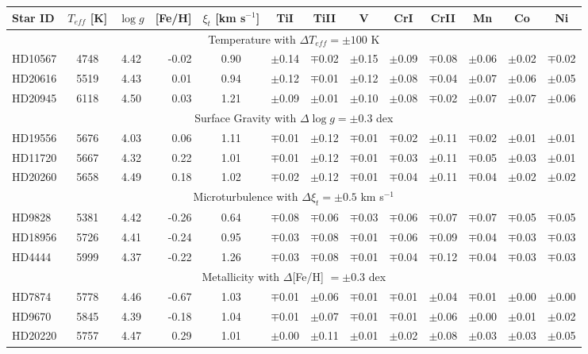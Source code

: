 \documentclass[oldversion]{aa}
\newcommand\T{\rule{0pt}{2.6ex}}
\newcommand\B{\rule[-1.2ex]{0pt}{0pt}}
\begin{document}
\begin{table}[t!]
\begin{tabular}{ l c c r c c c c c c c c}



\end{tabular}

  \begin{tabular}{l c c r c c c c c c c c c}

  \hline
Star ID \T & $T_{eff}$ [K] & $\log g$ & [Fe/H] & $\xi_t$ [km s$^{-1}$]	& TiI & TiII & V & CrI & CrII & Mn & Co & Ni \B \\
\hline
\multicolumn {13}{c}{Temperature with $\Delta T_{eff}=\pm100$ K} \\
HD10567 & 4748 & 4.42 & -0.02 & 0.90 & $\pm$0.14 & $\mp$0.02 & $\pm$0.15 & $\pm$0.09 & $\mp$0.08 & $\pm$0.06 & $\pm$0.02 & $\mp$0.02 \\
HD20616 & 5519 & 4.43 &  0.01 & 0.94 & $\pm$0.12 & $\mp$0.01 & $\pm$0.12 & $\pm$0.08 & $\mp$0.04 & $\pm$0.07 & $\pm$0.06 & $\pm$0.05 \\
HD20945 & 6118 & 4.50 &  0.03 & 1.21 & $\pm$0.09 & $\pm$0.01 & $\pm$0.10 & $\pm$0.08 & $\mp$0.02 & $\pm$0.07 & $\pm$0.07 & $\pm$0.06 \\
\multicolumn {13}{c}{Surface Gravity with $\Delta\log g=\pm0.3$ dex} \\
HD19556 & 5676 & 4.03 &  0.06 & 1.11 & $\mp$0.01 & $\pm$0.12 & $\mp$0.01 & $\mp$0.02 & $\pm$0.11 & $\mp$0.02 & $\pm$0.01 & $\pm$0.01 \\
HD11720 & 5667 & 4.32 &  0.22 & 1.01 & $\mp$0.01 & $\pm$0.12 & $\mp$0.01 & $\mp$0.03 & $\pm$0.11 & $\mp$0.05 & $\pm$0.03 & $\pm$0.01 \\
HD20260 & 5658 & 4.49 &  0.18 & 1.02 & $\mp$0.02 & $\pm$0.12 & $\mp$0.01 & $\mp$0.04 & $\pm$0.11 & $\mp$0.04 & $\pm$0.02 & $\pm$0.02 \\
\multicolumn {13}{c}{Microturbulence with $\Delta \xi_t=\pm0.5$ km s$^{-1}$} \\
HD9828 & 5381 & 4.42 & -0.26 & 0.64 & $\mp$0.08 & $\mp$0.06 & $\mp$0.03 & $\mp$0.06 & $\mp$0.07 & $\mp$0.07 & $\mp$0.05 & $\mp$0.05 \\
HD18956 & 5726 & 4.41 & -0.24 & 0.95 & $\mp$0.03 & $\mp$0.08 & $\mp$0.01 & $\mp$0.06 & $\mp$0.09 & $\mp$0.04 & $\mp$0.03 & $\mp$0.03 \\
HD4444 & 5999 & 4.37 & -0.22 & 1.26 & $\mp$0.03 & $\mp$0.08 & $\mp$0.01 & $\mp$0.04 & $\mp$0.12 & $\mp$0.04 & $\mp$0.03 & $\mp$0.03 \\
\multicolumn {13}{c}{Metallicity with $\Delta$[Fe/H] $=\pm$0.3 dex} \\
HD7874 & 5778 & 4.46 & -0.67 & 1.03 & $\mp$0.01 & $\pm$0.06 & $\mp$0.01 & $\mp$0.01 & $\pm$0.04 & $\mp$0.01 & $\pm$0.00 & $\pm$0.00 \\
HD9670 & 5845 & 4.39 & -0.18 & 1.04 & $\mp$0.01 & $\pm$0.07 & $\mp$0.01 & $\mp$0.01 & $\pm$0.06 & $\pm$0.00 & $\pm$0.01 & $\pm$0.02 \\
HD20220 & 5757 & 4.47 &  0.29 & 1.01 & $\pm$0.00 & $\pm$0.11 & $\pm$0.01 & $\pm$0.02 & $\pm$0.08 & $\pm$0.03 & $\pm$0.03 & $\pm$0.05 \\


\end{tabular}
\end{table}
\end{document}
